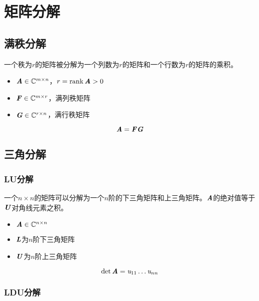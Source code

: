 \chapter{矩阵分解}
\label{cha:矩阵分解}



\section{满秩分解}
\label{sec:满秩分解}

\begin{definition}[满秩分解]
    一个秩为$r$的矩阵被分解为一个列数为$r$的矩阵和一个行数为$r$的矩阵的乘积。
    \begin{itemize}
        \item $\boldsymbol{\mathit{A}} \in \mathbb{C}^{m \times n}$，$r = \mathrm{rank}\, \boldsymbol{\mathit{A}} > 0$
        \item $\boldsymbol{\mathit{F}} \in \mathbb{C}^{m \times r}$，满列秩矩阵
        \item $\boldsymbol{\mathit{G}} \in \mathbb{C}^{r \times n}$，满行秩矩阵
    \end{itemize}
    $$
    \boldsymbol{\mathit{A}} = \boldsymbol{\mathit{F}} \boldsymbol{\mathit{G}}
    $$
\end{definition}

\section{三角分解}
\label{sec:三角分解}

\subsection{LU分解}
\label{sub:LU分解}

\begin{definition}[LU分解]
    一个$n \times n$的矩阵可以分解为一个$n$阶的下三角矩阵和上三角矩阵。$\boldsymbol{\mathit{A}}$的绝对值等于$\boldsymbol{\mathit{U}}$对角线元素之积。
    \begin{itemize}
        \item $\boldsymbol{\mathit{A}} \in \mathbb{C}^{n \times n}$
        \item $\boldsymbol{\mathit{L}}$为$n$阶下三角矩阵
        \item $\boldsymbol{\mathit{U}}$为$n$阶上三角矩阵
    \end{itemize}
    $$
    \det \boldsymbol{\mathit{A}} = \mathit{u}_{11}\ldots \mathit{u}_{nn}
    $$
\end{definition}

\subsection{LDU分解}
\label{sub:LDU分解}

